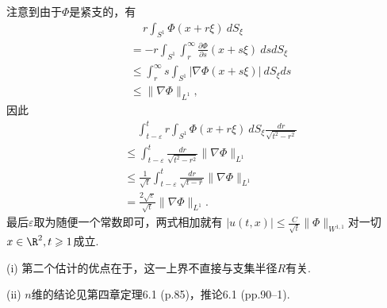 \begin{itemize}
注意到由于$\varPhi$是紧支的，有
\begin{align*}
    &\quad\,r\int_{S^1}\varPhi(x+r\xi)\>dS_\xi\\
    &=-r\int_{S^1}\int_r^\infty\frac{\partial\varPhi}{\partial s}(x+s\xi)\>dsdS_\xi\\
    &\leqslant\int_r^\infty s\int_{S^1}|\nabla\varPhi(x+s\xi)|\>dS_\xi ds\\
    &\leqslant\|\nabla\varPhi\|_{L^1},
\end{align*}
因此\begin{align*}
    &\quad\,\int_{t-\varepsilon}^t r\int_{S^1}\varPhi(x+r\xi)\>dS_\xi\frac{dr}{\sqrt{t^2-r^2}}\\
    &\leqslant\int_{t-\varepsilon}^t\frac{dr}{\sqrt{t^2-r^2}}\|\nabla\varPhi\|_{L^1}\\
    &\leqslant\frac{1}{\sqrt{t}}\int_{t-\varepsilon}^t\frac{dr}{\sqrt{t-r}}\|\nabla\varPhi\|_{L^1}\\
    &=\frac{2\sqrt{\varepsilon}}{\sqrt{t}}\|\nabla\varPhi\|_{L^1}.
\end{align*}
最后$\varepsilon$取为随便一个常数即可，两式相加就有
$|u(t,x)|\leqslant\frac{C}{\sqrt{t}}\|\varPhi\|_{W^{1,1}}$对一切$x\in\R^2,t\geqslant1$成立.

\begin{remark*}
(i) 第二个估计的优点在于，这一上界不直接与支集半径$R$有关.

(ii) $n$维的结论见\cite{LZ}第四章定理6.1 (p.85)，推论6.1 (pp.90--1).
\end{remark*}
\end{itemize}

